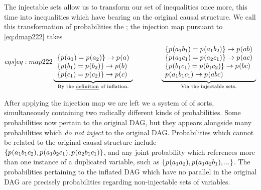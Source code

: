 {The injectable sets allow us to transform our set of inequalities once more, this time into inequalities which have bearing on the original causal structure. We call this transformation of probabilities the ; the injection map pursuant to \cref{eq:dmap222} takes
\begin{align}\label[eqs]{eq:map222}
\underbrace{\begin{array}{l} \\
 \{\p{a_1}=\p{a_2}\}\to \p{a} \\
 \{\p{b_1}=\p{b_2}\}\to \p{b} \\
 \{\p{c_1}=\p{c_2}\}\to \p{c} 
\end{array}}_{\text{By the \emph{definition} of inflation.}}
\qquad\qquad
\underbrace{\begin{array}{l}
 \{\p{a_1 b_1}=\p{a_1 b_2}\}\to \p{a b} \\
 \{\p{a_1 c_1}=\p{a_2 c_1}\}\to \p{a c} \\
 \{\p{b_1 c_1}=\p{b_1 c_2}\}\to \p{b c} \\
 \p{a_1 b_1 c_1}\to \p{a b c} \\
\end{array}}_{\text{Via the injectable sets.}}
\end{align}

After applying the injection map  we are left we a system of  of sorts, simultaneously containing two radically different kinds of probabilities. Some probabilities now pertain to the original DAG, but they appears alongside many probabilities which \emph{do not inject} to the original DAG. Probabilities which cannot be related to the original causal structure include $\{{p_{}}\lparen a_1 b_1 c_2\rparen,{p_{}}\lparen a_1 b_2 c_1\rparen,{p_{}}\lparen a_2 b_1 c_1\rparen\}$, and any joint probability which references more than one instance of a duplicated variable, such as $\{{p_{}}\lparen a_1 a_2\rparen,{p_{}}\lparen a_1 a_2 b_1\rparen,...\}$. The probabilities pertaining to the inflated DAG which have no parallel in the original DAG are precisely probabilities regarding non-injectable sets of variables.

}
